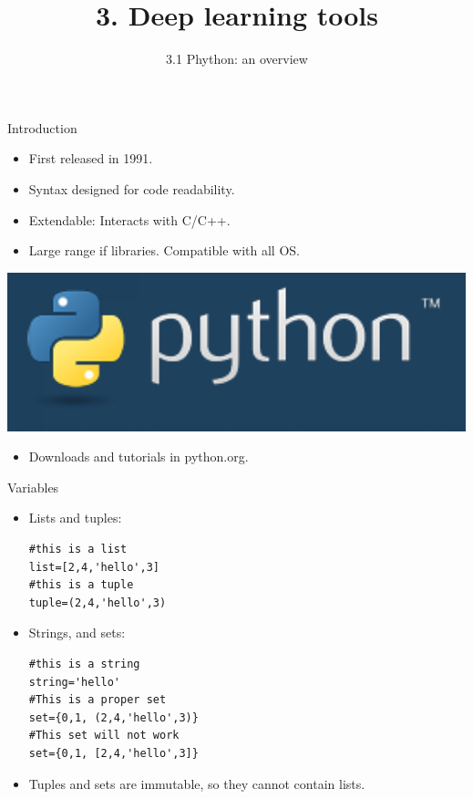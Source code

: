 \documentclass{beamer}
\title{3. Deep learning tools}
\subtitle{3.1 Phython: an overview}
\begin{document}
\maketitle

\begin{frame}{Introduction}
\begin{multicols}{2}
\begin{itemize}
    \item First released in 1991. 
    \item Syntax designed for code readability.
    \item Extendable: Interacts with C/C++.
    \item Large range if libraries. Compatible with all OS. 
   
\end{itemize}
\columnbreak
\includegraphics[scale=0.3]{Module 3 (Python tools)/pics/python.png} 
\begin{itemize}
\item Downloads and tutorials in python.org.
\end{itemize}
\end{multicols}
\end{frame}


\begin{frame}[fragile]{Variables}
\begin{itemize}
    \item Lists and tuples: 
\begin{lstlisting}
#this is a list
list=[2,4,'hello',3]
#this is a tuple
tuple=(2,4,'hello',3)
\end{lstlisting}

\item Strings, and sets:  
    
\begin{lstlisting}
#this is a string 
string='hello'
#This is a proper set
set={0,1, (2,4,'hello',3)}
#This set will not work
set={0,1, [2,4,'hello',3]}
\end{lstlisting}
\item Tuples and sets are immutable, so they cannot contain lists.
\end{itemize}
\end{frame}
\end{document}
